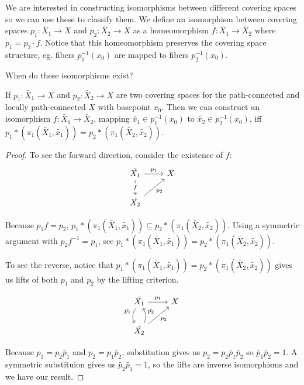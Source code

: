 \documentclass[10pt]{article}
\begin{document}
We are interested in constructing isomorphisms between different covering
spaces so we can use these to classify them. We define an isomorphism between
covering spaces $p_1: \tilde{X_1} \to X$ and $p_2: \tilde{X_2} \to X$ as a
homeomorphism $f: \tilde{X_1} \to \tilde{X_2}$ where $p_1 = p_2 \cdot f$.
Notice that this homeomorphism preserves the covering space structure, eg.
fibers $p_1^{-1}(x_0)$ are mapped to fibers $p_2^{-1}(x_0)$.

When do these isomorphisms exist?

\begin{exercise}
	If $p_1: \tilde{X_1} \to X$ and $p_2: \tilde{X_2} \to X$ are two covering
	spaces for the path-connected and locally path-connected $X$ with basepoint
	$x_0$. Then we can construct an isomorphism $f: \tilde{X_1} \to \tilde{X_2}$, mapping
	$\tilde{x_1} \in p_1^{-1}(x_0)$ to $\tilde{x_2} \in p_2^{-1}(x_0)$, iff
	$p_1*(\pi_1(\tilde{X_1}, \tilde{x_1})) = p_2*(\pi_1(\tilde{X_2}, \tilde{x_2}))$.
\end{exercise}

\begin{proof}
	To see the forward direction, consider the existence of $f$:
	\[
	\begin{tikzcd}
	\tilde{X_1} \arrow[r, "p_1"] \arrow[d, "f" description] & X \\
	\tilde{X_2} \arrow[ru, "p_2"']                          &  
	\end{tikzcd}
	\]

	Because $p_1f = p_2$, $p_1*(\pi_1(\tilde{X_1}, \tilde{x_1})) \subseteq
	p_2*(\pi_1(\tilde{X_2}, \tilde{x_2}))$. Using a symmetric argument with
	$p_2f^{-1} = p_1$, see $p_1*(\pi_1(\tilde{X_1}, \tilde{x_1})) = p_2*(\pi_1(\tilde{X_2},
	\tilde{x_2}))$.

	To see the reverse, notice that $p_1*(\pi_1(\tilde{X_1}, \tilde{x_1})) = p_2*(\pi_1(\tilde{X_2}, \tilde{x_2}))$ gives us lifts of both $p_1$ and $p_2$
	by the lifting criterion.

		\[
	\begin{tikzcd}
	\tilde{X_1} \arrow[r, "p_1"] \arrow[d, "\tilde{p_1}"', bend right]   & X \\
	\tilde{X_2} \arrow[ru, "p_2"'] \arrow[u, "\tilde{p_2}"', bend right] &  
	\end{tikzcd}
	\]

	Because $p_1 = p_2 \tilde{p_1}$ and $p_2 = p_1 \tilde{p_2}$, substitution gives
	us $p_2 = p_2 \tilde{p_1}\tilde{p_2}$ so $\tilde{p_1}\tilde{p_2} = 1$. A
	symmetric substituion gives us $\tilde{p_2}\tilde{p_1} = 1$, so the lifts are
	inverse isomorphisms and we have our result.

\end{proof}
\end{document}
